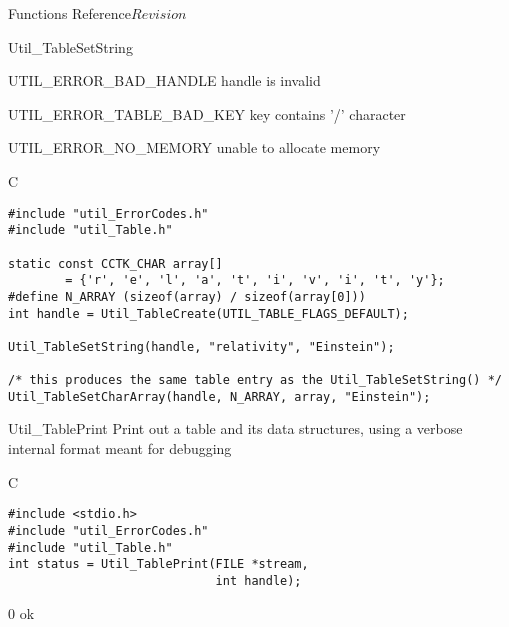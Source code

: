 \begin{cactuspart}{ Functions Reference}{}{$Revision$}
\begin{FunctionDescription}{Util\_TableSetString}
\begin{ErrorSection}
\begin{Error}{UTIL\_ERROR\_BAD\_HANDLE}
handle is invalid
\end{Error}
\begin{Error}{UTIL\_ERROR\_TABLE\_BAD\_KEY}
key contains '/' character
\end{Error}
\begin{Error}{UTIL\_ERROR\_NO\_MEMORY}
unable to allocate memory
\end{Error}
\end{ErrorSection}

\begin{ExampleSection}
\begin{Example}{C}
\begin{verbatim}
#include "util_ErrorCodes.h"
#include "util_Table.h"

static const CCTK_CHAR array[]
        = {'r', 'e', 'l', 'a', 't', 'i', 'v', 'i', 't', 'y'};
#define N_ARRAY (sizeof(array) / sizeof(array[0]))
int handle = Util_TableCreate(UTIL_TABLE_FLAGS_DEFAULT);

Util_TableSetString(handle, "relativity", "Einstein");

/* this produces the same table entry as the Util_TableSetString() */
Util_TableSetCharArray(handle, N_ARRAY, array, "Einstein");
\end{verbatim}
\end{Example}
\end{ExampleSection}
\end{FunctionDescription}


\begin{FunctionDescription}{Util\_TablePrint}
\label{Util-TablePrint}
Print out a table and its data structures, using a verbose internal
format meant for debugging

\begin{SynopsisSection}
\begin{Synopsis}{C}
\begin{verbatim}
#include <stdio.h>
#include "util_ErrorCodes.h"
#include "util_Table.h"
int status = Util_TablePrint(FILE *stream,
                             int handle);
\end{verbatim}
\end{Synopsis}
\end{SynopsisSection}

\begin{ResultSection}
\begin{Result}{\rm 0}
ok
\end{Result}
\end{ResultSection}


\end{FunctionDescription}
\end{cactuspart}
